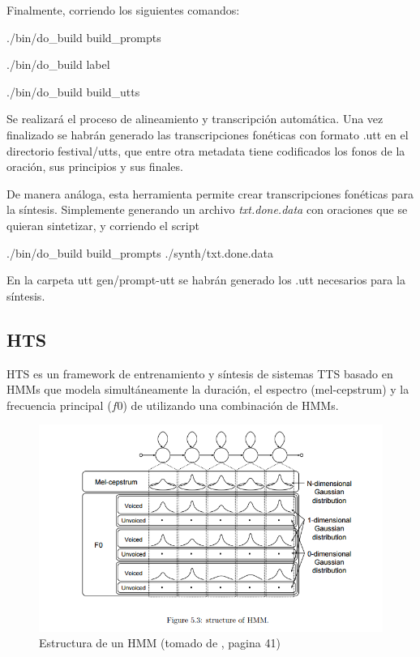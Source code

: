 Finalmente, corriendo los siguientes comandos:

\begin{tcolorbox}
./bin/do\_build build\_prompts

./bin/do\_build label

./bin/do\_build build\_utts
\end{tcolorbox}

\noindent Se realizará el proceso de alineamiento y transcripción automática. Una vez finalizado se habrán generado las transcripciones fonéticas con formato .utt en el directorio festival/utts, que entre otra metadata tiene codificados los fonos de la oración, sus principios y sus finales.

De manera análoga, esta herramienta permite crear transcripciones fonéticas para la síntesis. Simplemente generando un archivo \textit{txt.done.data} con oraciones que se quieran sintetizar, y corriendo el script

\begin{tcolorbox}
./bin/do\_build build\_prompts ./synth/txt.done.data
\end{tcolorbox}

En la carpeta utt gen/prompt-utt se habrán generado los .utt necesarios para la síntesis.


\subsection{HTS}


HTS \cite{hts} es un framework de entrenamiento y síntesis de sistemas TTS basado en HMMs que modela simultáneamente la duración, el espectro (mel-cepstrum) y la frecuencia principal ($f0$) de utilizando una combinación de HMMs.

\begin{figure}
\includegraphics[scale=0.5]{imagenes/hmm.png}
\caption{Estructura de un HMM (tomado de \cite{phoneticAndProsodic}, pagina 41)}
\label{hmmStructure}
\centering
\end{figure}

